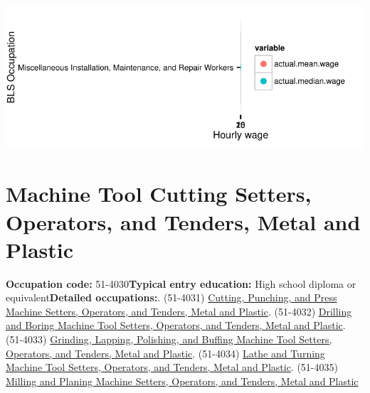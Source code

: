 \documentclass[a4paper,10pt]{article}\usepackage[]{graphicx}\usepackage[]{color}
\makeatletter
\def\maxwidth{ %
  \ifdim\Gin@nat@width>\linewidth
    \linewidth
  \else
    \Gin@nat@width
  \fi
}
\makeatother
\begin{document}
{\centering \includegraphics[width=\maxwidth]{figure/unnamed-chunk-297} 

}


\newpage\section{Machine Tool Cutting Setters, Operators, and Tenders, Metal and Plastic}\textbf{Occupation code:} 51-4030\newline\textbf{Typical entry education:} High school diploma or equivalent\newline\textbf{Detailed occupations:}. (51-4031)  \href{http://www.bls.gov/oes/current/oes514031.htm}{Cutting, Punching, and Press Machine Setters, Operators, and Tenders, Metal and Plastic}. (51-4032)  \href{http://www.bls.gov/oes/current/oes514032.htm}{Drilling and Boring Machine Tool Setters, Operators, and Tenders, Metal and Plastic}. (51-4033)  \href{http://www.bls.gov/oes/current/oes514033.htm}{Grinding, Lapping, Polishing, and Buffing Machine Tool Setters, Operators, and Tenders, Metal and Plastic}. (51-4034)  \href{http://www.bls.gov/oes/current/oes514034.htm}{Lathe and Turning Machine Tool Setters, Operators, and Tenders, Metal and Plastic}. (51-4035)  \href{http://www.bls.gov/oes/current/oes514035.htm}{Milling and Planing Machine Setters, Operators, and Tenders, Metal and Plastic}\newline%
\end{document}
